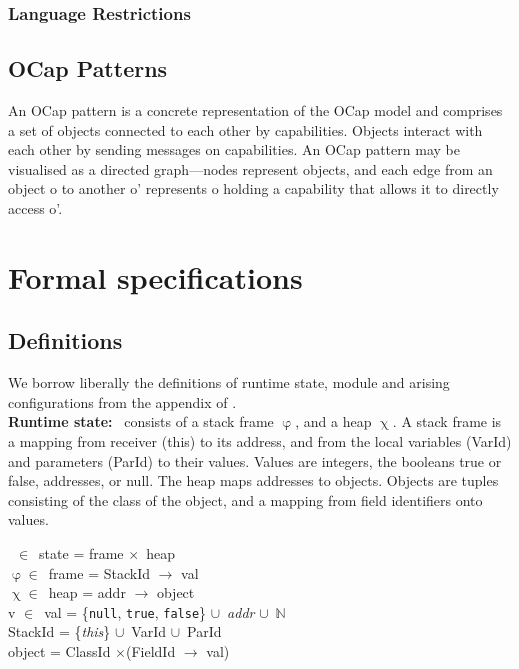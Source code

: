 \documentclass[a4paper,11pt, twoside,twocolumn]{article}
\newenvironment{logic}
{\begin{minipage}[c]{\linewidth}  \small \vspace{0.5em}\begin{tabbing}}
{\end{tabbing}\end{minipage}\vspace{0.5em}}
\newcommand{\loin}{$\in$}
\newcommand{\losigma}{\text{$\upsigma$}}
\newcommand{\lochi}{$\upchi$}
\newcommand{\lophi}{$\upvarphi$}
\newcommand{\locup} {$\cup$}
\newcommand{\lotimes} {$\times$}
\begin{document}
\subsubsection{Language Restrictions}
\subsection{OCap Patterns}
An OCap pattern is a concrete representation of the OCap model and comprises a set of objects connected to each other by capabilities. Objects interact with each other by sending messages on capabilities. An OCap pattern may be visualised as a directed graph---nodes represent objects, and each edge from an object o to another o' represents o holding a capability that allows it to directly access o'.
\newpage
\section{Formal specifications}
\subsection{Definitions}\noindent
We borrow liberally the definitions of runtime state, module and arising configurations from the appendix of \cite{drossopoulou2015b}.\\
\textbf{Runtime state:}
 \losigma\ consists of a stack frame \lophi, and a heap \lochi. A stack frame is a mapping from receiver (this) to its address, and from the local variables (VarId) and parameters (ParId) to their values. Values are integers, the booleans true or false, addresses, or null. The heap maps addresses to objects. Objects are tuples consisting of the class of the object, and a mapping from field identifiers onto values.\\
 
 \begin{logic}[Runtime state]
\losigma\ \loin\ state = frame \lotimes\ heap \\
\lophi \loin\ frame = StackId $\rightarrow$ val \\
\lochi \loin\ heap = addr $\rightarrow$ object \\
v \loin\ val = \{\texttt{null}, \texttt{true}, \texttt{false}\} \locup\ \textit{addr} \locup\ $\mathbb{N}$ \\
StackId = \{\textit{this}\} \locup\ VarId \locup\ ParId \\
object = ClassId \lotimes (FieldId $\rightarrow$ val)\\
\end{logic}
\end{document}
